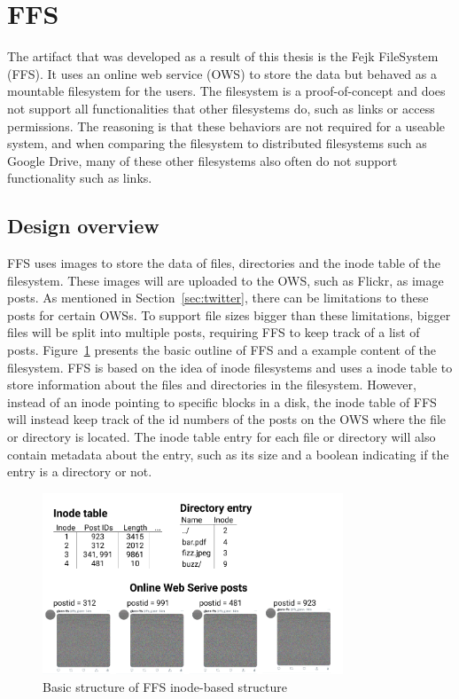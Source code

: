\section{FFS}
The artifact that was developed as a result of this thesis is the Fejk FileSystem (FFS). It uses an online web service (OWS) to store the data but behaved as a mountable filesystem for the users. The filesystem is a proof-of-concept and does not support all functionalities that other filesystems do, such as links or access permissions. The reasoning is that these behaviors are not required for a useable system, and when comparing the filesystem to distributed filesystems such as Google Drive, many of these other filesystems also often do not support functionality such as links.

\subsection{Design overview}
FFS uses images to store the data of files, directories and the inode table of the filesystem. These images will are uploaded to the OWS, such as Flickr, as image posts. As mentioned in Section~\ref{sec:twitter}, there can be limitations to these posts for certain OWSs. To support file sizes bigger than these limitations, bigger files will be split into multiple posts, requiring FFS to keep track of a list of posts. Figure~\ref{fig:ffs_inode_diag} presents the basic outline of FFS and a example content of the filesystem. FFS is based on the idea of inode filesystems and uses a inode table to store information about the files and directories in the filesystem. However, instead of an inode pointing to specific blocks in a disk, the inode table of FFS will instead keep track of the id numbers of the posts on the OWS where the file or directory is located. The inode table entry for each file or directory will also contain metadata about the entry, such as its size and a boolean indicating if the entry is a directory or not.

\begin{figure}[!ht]
	\begin{center}
	  \includegraphics[width=0.8\textwidth]{figures/ffs_inode_diagram.png}
	\end{center}
	\caption{Basic structure of FFS inode-based structure}
	\label{fig:ffs_inode_diag}
\end{figure}

